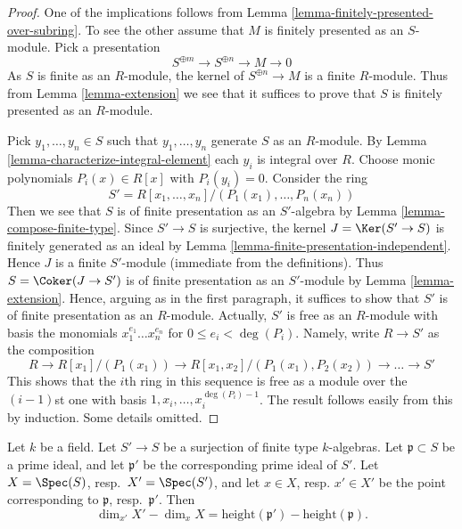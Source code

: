 \begin{proof}
One of the implications follows from
Lemma \ref{lemma-finitely-presented-over-subring}.
To see the other assume that $M$ is finitely presented as an $S$-module.
Pick a presentation
$$
S^{\oplus m} \longrightarrow
S^{\oplus n} \longrightarrow
M \longrightarrow 0
$$
As $S$ is finite as an $R$-module, the kernel of
$S^{\oplus n} \to M$ is a finite $R$-module. Thus from
Lemma \ref{lemma-extension}
we see that it suffices to prove that $S$ is finitely presented as an
$R$-module.

\medskip\noindent
Pick $y_1, \ldots, y_n \in S$ such that $y_1, \ldots, y_n$ generate $S$
as an $R$-module. By Lemma \ref{lemma-characterize-integral-element}
each $y_i$ is integral over $R$. Choose monic polynomials
$P_i(x) \in R[x]$ with $P_i(y_i) = 0$. Consider the ring
$$
S' = R[x_1, \ldots, x_n]/(P_1(x_1), \ldots, P_n(x_n))
$$
Then we see that $S$ is of finite presentation as an $S'$-algebra
by Lemma \ref{lemma-compose-finite-type}. Since $S' \to S$ is surjective,
the kernel $J = \Ker(S' \to S)$ is finitely generated as an ideal by
Lemma \ref{lemma-finite-presentation-independent}. Hence $J$ is a finite
$S'$-module (immediate from the definitions).
Thus $S = \Coker(J \to S')$ is  of finite presentation as an $S'$-module
by Lemma \ref{lemma-extension}.
Hence, arguing as in the first paragraph, it suffices to show that $S'$ is
of finite presentation as an $R$-module. Actually, $S'$ is free as an
$R$-module with basis the monomials $x_1^{e_1} \ldots x_n^{e_n}$
for $0 \leq e_i < \deg(P_i)$. Namely, write $R \to S'$ as the composition
$$
R \to R[x_1]/(P_1(x_1)) \to R[x_1, x_2]/(P_1(x_1), P_2(x_2)) \to
\ldots \to S'
$$
This shows that the $i$th ring in this sequence is free as a module over the
$(i - 1)$st one with basis $1, x_i, \ldots, x_i^{\deg(P_i) - 1}$. The result
follows easily from this by induction. Some details omitted.
\end{proof}

\begin{lemma}
\label{lemma-codimension}
Let $k$ be a field.
Let $S' \to S$ be a surjection of finite type $k$-algebras.
Let $\mathfrak p \subset S$ be a prime ideal,
and let $\mathfrak p'$ be the corresponding prime ideal of $S'$.
Let $X = \Spec(S)$, resp.\ $X' = \Spec(S')$,
and let $x \in X$, resp. $x'\in X'$ be the point corresponding
to $\mathfrak p$, resp.\ $\mathfrak p'$.
Then
$$
\dim_{x'} X' - \dim_x X =
\text{height}(\mathfrak p') - \text{height}(\mathfrak p).
$$
\end{lemma}

